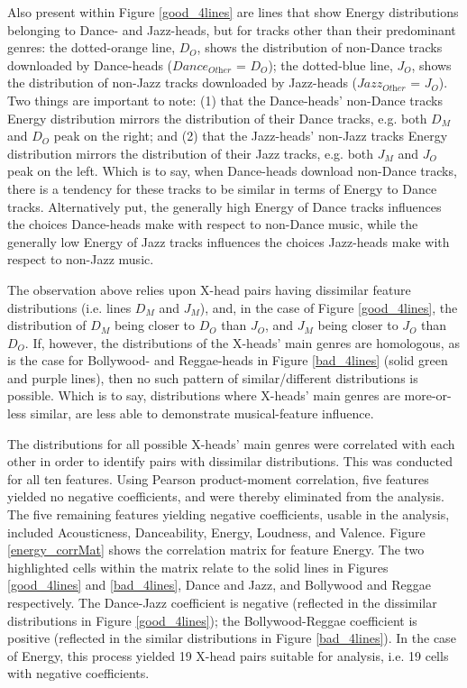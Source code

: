 \documentclass[a4paper]{article}
\begin{document}
Also present within Figure \ref{good_4lines} are lines that show Energy distributions belonging to Dance- and Jazz-heads, but for tracks other than their predominant genres: the dotted-orange line, $D_O$, shows the distribution of non-Dance tracks downloaded by Dance-heads ($Dance_{\textit{Other}}$ = $D_O$); the dotted-blue line, $J_O$, shows the distribution of non-Jazz tracks downloaded by Jazz-heads ($Jazz_{\textit{Other}}$ = $J_O$). Two things are important to note: (1) that the Dance-heads’ non-Dance tracks Energy distribution mirrors the distribution of their Dance tracks, e.g. both $D_M$ and $D_O$ peak on the right; and (2) that the Jazz-heads’ non-Jazz tracks Energy distribution mirrors the distribution of their Jazz tracks, e.g. both $J_M$ and $J_O$ peak on the left. Which is to say, when Dance-heads download non-Dance tracks, there is a tendency for these tracks to be similar in terms of Energy to Dance tracks. Alternatively put, the generally high Energy of Dance tracks influences the choices Dance-heads make with respect to non-Dance music, while the generally low Energy of Jazz tracks influences the choices Jazz-heads make with respect to non-Jazz music. 

The observation above relies upon X-head pairs having dissimilar feature distributions (i.e. lines $D_M$ and $J_M$), and, in the case of Figure \ref{good_4lines}, the distribution of $D_M$ being closer to $D_O$ than $J_O$, and $J_M$ being closer to $J_O$ than $D_O$. If, however, the distributions of the X-heads’ main genres are homologous, as is the case for Bollywood- and Reggae-heads in Figure \ref{bad_4lines} (solid green and purple lines), then no such pattern of similar/different distributions is possible. Which is to say, distributions where X-heads’ main genres are more-or-less similar, are less able to demonstrate musical-feature influence. 

The distributions for all possible X-heads’ main genres were correlated with each other in order to identify pairs with dissimilar distributions. This was conducted for all ten features. Using Pearson product-moment correlation, five features yielded no negative coefficients, and were thereby eliminated from the analysis. The five remaining features yielding negative coefficients, usable in the analysis, included Acousticness, Danceability, Energy, Loudness, and Valence. Figure \ref{energy_corrMat} shows the correlation matrix for feature Energy. The two highlighted cells within the matrix relate to the solid lines in Figures \ref{good_4lines} and \ref{bad_4lines}, Dance and Jazz, and Bollywood and Reggae respectively. The Dance-Jazz coefficient is negative (reflected in the dissimilar distributions in Figure \ref{good_4lines}); the Bollywood-Reggae coefficient is positive (reflected in the similar distributions in Figure \ref{bad_4lines}). In the case of Energy, this process yielded 19 X-head pairs suitable for analysis, i.e. 19 cells with negative coefficients. 
\end{document}
